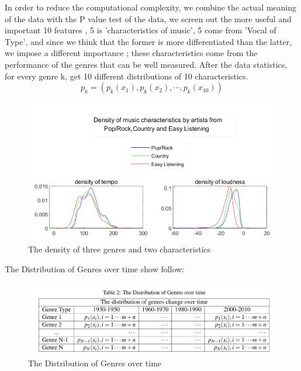 \documentclass[conference]{IEEEtran}
\begin{document}
In order to reduce the computational complexity, we combine the actual meaning of the data with the P value test of the data, we screen out the more useful and important 10 features , 5 is 'characteristics of music', 5 come from 'Vocal of Type', and since we think that the former is more differentiated than the latter, we impose a different importance ; these characteristics come from the performance of the genres that can be well measured. After the data statistics, for every genre k, get 10 different distributions of 10 characteristics.
\[p_k=(p_k(x_1),p_k(x_2),\cdots,p_k(x_{10}))\]
\begin{figure}[htbp]
	\centering
	\includegraphics[width=.4\textwidth]{./img/density}
	\caption{The density of three genres and two characteristics}\label{fig:density}
\end{figure}

The Distribution of Genres over time show follow:\\
\begin{figure}[h]
	\includegraphics[width=.52\textwidth]{./img/qqq.png}
	\caption{The Distribution of Genres over time}
\end{figure}
		
\end{document}
